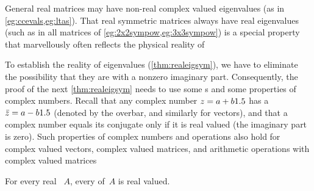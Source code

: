 
General real matrices may have non-real complex valued eigenvalues (as in \cref{eg:ccevals,eg:ltas}). 
That real symmetric matrices always have real eigenvalues (such as in all matrices of \cref{eg:2x2sympow,eg:3x3sympow}) is a special property that marvellously often reflects the physical reality of 

To establish the reality of eigenvalues (\cref{thm:realeigsym}), we have to eliminate the possibility that they are  with a nonzero imaginary part.
Consequently, the proof of the next \cref{thm:realeigsym} needs to use some s and some properties of complex numbers.
Recall that any complex number \(z=a+b1.5\) has a  \(\bar z=a-b1.5\) (denoted by the overbar, and similarly for vectors), and that a complex number equals its conjugate only if it is real valued (the imaginary part is zero).
Such properties of complex numbers and operations also hold for complex valued vectors, complex valued matrices, and arithmetic operations with complex valued matrices 


\begin{comment}
Have not yet thought of reasonable Activities for this subsection.
\end{comment}




\begin{theorem} \label{thm:realeigsym} 
For every real ~\(A\), every  of~\(A\) is real valued.
\end{theorem}


